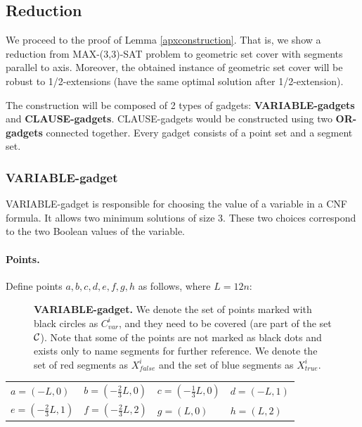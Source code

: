 \subsection{Reduction}
\label{construction_description}
We proceed to the proof of Lemma \ref{apxconstruction}.
That is, we show a reduction from MAX-(3,3)-SAT problem
to geometric set cover with segments
parallel to axis. Moreover, the obtained instance
of geometric set cover will be robust
to 1/2-extensions (have the same optimal solution
after 1/2-extension).

The construction will be composed of 2 types of gadgets:
\textbf{VARIABLE-gadgets} and \textbf{CLAUSE-gadgets}.
CLAUSE-gadgets would be constructed using two \textbf{OR-gadgets}
connected together.
Every gadget consists of a point set and a segment set.


\subsubsection{VARIABLE-gadget}

VARIABLE-gadget is responsible for choosing the value of a variable
in a CNF formula. It allows two minimum solutions of size 3.
These two choices correspond to the two Boolean values of the variable.

\paragraph{Points.}

Define points $a,b,c,d,e,f,g,h$ as follows, where $L = 12n$:

\begin{figure}[h]
\centering
\def\svgwidth{0.5\columnwidth}

\caption{\textbf{VARIABLE-gadget.}
We denote the set of points marked with black circles as $C_{var}^i$,
and they need to be covered (are part of the set $\mathcal{C}$).
Note that some of the points are not marked as black dots
and exists only to name segments for further reference.
We denote the set of red segments as $X_{false}^i$
and the set of blue segments as $X_{true}^i$.}
\label{fig:apx_choose_variable}
\end{figure}

\begin{center}
\begin{tabular}{ l l l l}
	$a = (-L, 0)$ &
	$b = (-\frac{2}{3}L, 0)$ & 
	$c = (-\frac{1}{3}L, 0)$ & 
	$d = (-L, 1)$ \\  
	$e = (-\frac{2}{3}L, 1)$ & 
	$f = (-\frac{2}{3}L, 2)$ &
	$g = (L, 0)$ &
	$h = (L, 2)$
\end{tabular}
\end{center}

